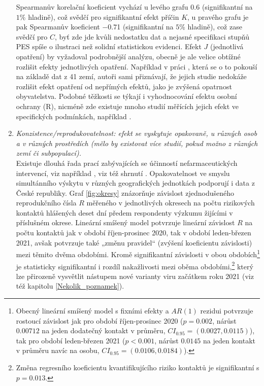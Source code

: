 \begin{enumerate}
Spearmanův korelační koeficient
vychází u levého grafu $0.6$ (signifikantní na $1\%$ hladině), což svědčí pro
signifikantní efekt příčin $K$, u pravého grafu je pak Spearmanův koeficient $-0.7$1 (signifikantní na $5$\% hladině), což zase svědčí pro $C$, byť zde jde kvůli nedostatku dat a nejasné specifikaci stupňů PES spíše o ilustraci než solidní statistickou evidenci. Efekt $J$ (jednotlivá opatření)
by vyžadoval podrobnější analýzu, obecně je ale velice obtížné rozlišit efekty
jednotlivých opatření. Například v práci \cite{brauner2021inferring},
která se o to pokouší na základě dat z 41 zemí, autoři sami přiznávají,
že jejich studie nedokáže rozlišit efekt opatření od nepřímých efektů,
jako je zvýšená opatrnost obyvatelstva. Podobné těžkosti se týkají
i vyhodnocování efektu osobní ochrany (R), nicméně zde existuje mnoho
studií měřících jejich efekt ve specifických podmínkách, například \cite{chu2020physical}.
\item \emph{Konzistence/reprodukovatelnost: efekt se vyskytuje opakovaně,
u různých osob a v různých prostředích (mělo by existovat více studií,
pokud možno z různých zemí či subpopulací).}\\
Existuje dlouhá řada prací zabývajících se 
účinností nefarmaceutických intervencí, viz například \cite{flaxman2020estimating},
viz též shrnutí \cite{kluveitOpat}. 
Opakovatelnost ve smyslu simultánního výskytu v různých geografických jednotkách podporují i data z České republiky. Graf \ref{fig:okresy} znázorňuje závislost zjednodušeného reprodukčního čísla $R$ měřeného v jednotlivých okresech na počtu rizikových kontaktů hlášených deset dní předem respondenty výzkumu \cite{paqcovid} žijícími v příslušném okrese. Lineární smíšený model potvrzuje lineární závislost $R$ na počtu kontaktů jak v období říjen-prosinec 2020, tak v období leden-březen 2021, avšak potvrzuje také „změnu pravidel“ (zvýšení koeficientu závislosti) mezi těmito dvěma obdobími. Kromě signifikantní závislosti v obou obdobích\footnote{Obecný lineární smíšený model s fixními efekty a $AR(1)$ rezidui potvrzuje rostoucí závislost jak pro období říjen-prosinec 2020 ($p=0.002$, nárůst $0.00712$ na jeden dodatečný kontakt v průměru, $CI_{0.95}=(0.0027,0.0115)$), tak pro období leden-březen 2021 ($p<0.001$, nárůst $0.0145$ na jeden kontakt v průměru navíc na osobu, $CI_{0.95}=(0.0106,0.0184)$).} je statisticky signifikantní i rozdíl nakažlivosti mezi oběma obdobími,\footnote{Změna regresního koeficientu kvantifikujícího riziko kontaktů je signifikantní s $p=0.013$.} který lze přirozeně vysvětlit nástupem nové varianty viru začátkem roku 2021 (viz též kapitolu \ref{Nekolik_poznamek}).



\end{enumerate}
